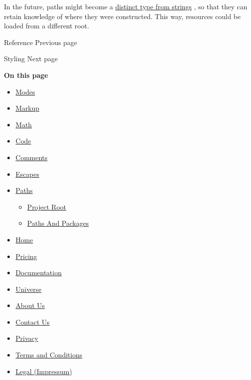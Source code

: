 In the future, paths might become a
\href{https://github.com/typst/typst/issues/971}{distinct type from
strings} , so that they can retain knowledge of where they were
constructed. This way, resources could be loaded from a different root.

\href{/docs/reference/}{\pandocbounded{}}

{ Reference } { Previous page }

\href{/docs/reference/styling/}{\pandocbounded{}}

{ Styling } { Next page }

\textbf{On this page}

\begin{itemize}
\tightlist
\item
  \hyperref[modes]{Modes}
\item
  \hyperref[markup]{Markup}
\item
  \hyperref[math]{Math}
\item
  \hyperref[code]{Code}
\item
  \hyperref[comments]{Comments}
\item
  \hyperref[escapes]{Escapes}
\item
  \hyperref[paths]{Paths}

  \begin{itemize}
  \tightlist
  \item
    \hyperref[project-root]{Project Root}
  \item
    \hyperref[paths-and-packages]{Paths And Packages}
  \end{itemize}
\end{itemize}

\begin{itemize}
\tightlist
\item
  \href{/}{Home}
\item
  \href{/pricing/}{Pricing}
\item
  \href{/docs/}{Documentation}
\item
  \href{/universe/}{Universe}
\item
  \href{/about/}{About Us}
\item
  \href{/contact/}{Contact Us}
\item
  \href{/privacy/}{Privacy}
\item
  \href{https://typst.app/terms}{Terms and Conditions}
\item
  \href{/legal/}{Legal (Impressum)}
\end{itemize}

